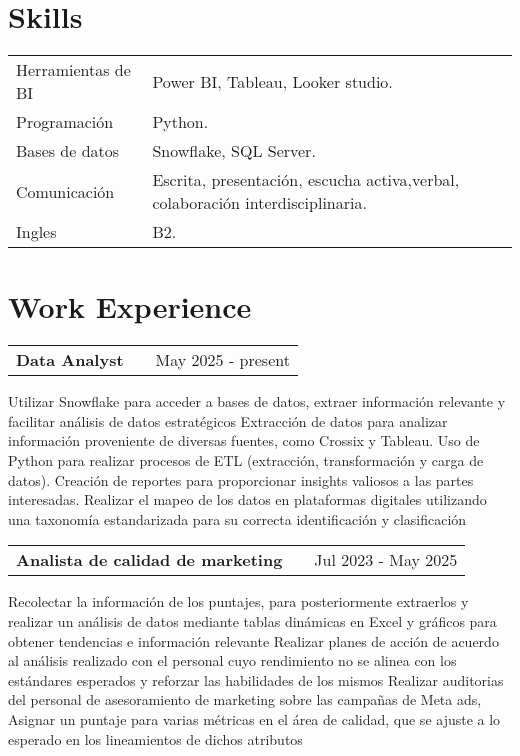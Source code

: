 \documentclass[a4paper,12pt]{article}
\makeatletter
\newenvironment{jobshort}[2]
    {
    \begin{tabularx}{\linewidth}{@{}l X r@{}}
    \textbf{#1} & \hfill &  #2 \\[3.75pt]
    \end{tabularx}
    }
    {
    }
\makeatother
\begin{document}
\section{Skills}
\begin{tabularx}{\linewidth}{@{}l X@{}}
Herramientas de BI &  \normalsize{Power BI, Tableau, Looker studio.}\\
Programación &  \normalsize{Python.}\\
Bases de datos &  \normalsize{Snowflake, SQL Server.}\\
Comunicación &  \normalsize{Escrita, presentación, escucha activa,verbal, colaboración interdisciplinaria.}\\
Ingles  &  \normalsize{B2.}\\  
\end{tabularx}

\section{Work Experience}

\begin{jobshort}{Data Analyst}{May 2025 - present}
Utilizar Snowflake para acceder a bases de datos, extraer información relevante y facilitar análisis de datos estratégicos
Extracción de datos para analizar información proveniente de diversas fuentes, como Crossix y Tableau.
Uso de Python para realizar procesos de ETL (extracción, transformación y carga de datos).
Creación de reportes para proporcionar insights valiosos a las partes interesadas.
Realizar el mapeo de los datos en plataformas digitales utilizando una taxonomía estandarizada para su correcta identificación y clasificación
\end{jobshort}

\begin{jobshort}{Analista de calidad de marketing}{Jul 2023 - May 2025}
Recolectar la información de los puntajes, para posteriormente extraerlos y realizar un análisis de datos
mediante tablas dinámicas en Excel y gráficos para obtener tendencias e información relevante
Realizar planes de acción de acuerdo al análisis realizado con el personal cuyo rendimiento no se alinea con
los estándares esperados y reforzar las habilidades de los mismos
Realizar auditorias del personal de asesoramiento de marketing sobre las campañas de Meta ads,
Asignar un puntaje para varias métricas en el área de calidad, que se ajuste a lo esperado en los lineamientos
de dichos atributos
\end{jobshort}
\end{document}
